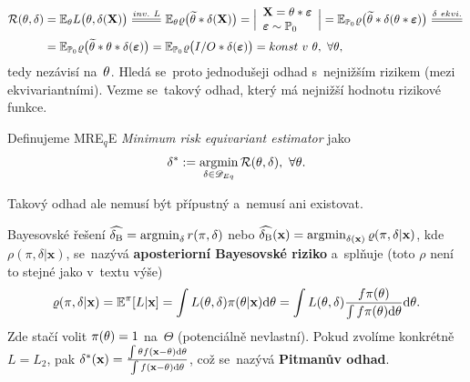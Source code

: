 \begin{dusl}
	\[
	\begin{split}
	\RF(\t,\delta)&=\E_\t L\big(\t,\delta(\textbf{X})\big)\equal{inv.~L}\E_\t\rho\big(\widetilde{\t}\ast\delta(\textbf{X})\big)=\Big|\begin{array}{l}
	\textbf{X}=\t\ast\boldsymbol{\epsilon}\\\boldsymbol{\epsilon}\sim\PP_0	
	\end{array}
	\Big|=\E_{\PP_0}\rho\big(\widetilde{\t}\ast\delta(\t\ast\boldsymbol{\epsilon})\big)\equal{\delta~ekvi.}\\&=\E_{\PP_0}\rho\big(\widetilde{\t}\ast\t\ast\delta(\boldsymbol{\epsilon})\big)=\E_{\PP_0}\rho\big(I/O\ast\delta(\boldsymbol{\epsilon})\big)=konst~v~\t,~\forall\t,
	\end{split}
	\]
	tedy nezávisí na~$\theta$. Hledá se~proto jednodušeji odhad s~nejnižším rizikem (mezi ekvivariantními). Vezme se~takový odhad, který má nejnižší hodnotu rizikové funkce. 
\end{dusl}
\begin{define}
	Definujeme MRE$_q$E \textit{Minimum risk equivariant estimator} jako $$ \delta^\ast:=\mathop{\mathrm{argmin}}_{\delta\in\mathscr{D} _{Eq}}\mathcal{R}(\theta,\delta),~\forall\theta.$$
\end{define}
Takový odhad ale nemusí být přípustný a~nemusí ani existovat. 

\begin{remark}
	Bayesovské řešení $\widehat{\delta_\mathrm{B}}=\mathop{\mathrm{argmin}}_\delta r(\pi,\delta)$ nebo $\widehat{\delta_\mathrm{B}}(\textbf{x})= \mathop{\mathrm{argmin}}_{\delta(\textbf{x})}\varrho(\pi,\delta|\textbf{x})$, kde $\rho(\pi,\delta|\textbf{x})$, se~nazývá \textbf{aposteriorní Bayesovské riziko} a~splňuje (toto $\rho$ není to stejné jako v~textu výše) 
	$$ \varrho(\pi,\delta|\textbf{x})=\mathbb{E}^\pi[L|\textbf{x}]=\int L(\theta,\delta)\pi(\theta|\textbf{x})\mathrm{d}\theta=\int L(\theta,\delta)\frac{f \pi(\theta)}{\int f \pi(\theta)\mathrm{d}\theta}\mathrm{d}\theta.$$
	Zde stačí volit $\pi(\theta)=1$ na~$\Theta$ (potenciálně nevlastní). Pokud zvolíme konkrétně $L=L_2$, pak $\delta^\ast(\textbf{x})=\frac{\int\theta f(\textbf{x}-\theta)\mathrm{d}\theta}{\int f(\textbf{x}-\theta)\mathrm{d}\theta}$, což se~nazývá \textbf{Pitmanův odhad}.
\end{remark}

